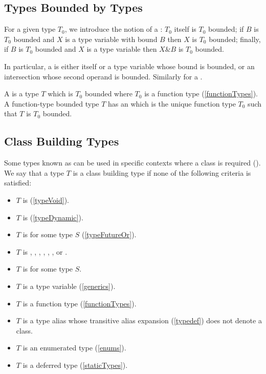 \documentclass[makeidx]{article}
\begin{document}
{\subsection{Types Bounded by Types}

\LMHash{}%
For a given type $T_0$, we introduce the notion of a
:
$T_0$ itself is $T_0$ bounded;
if $B$ is $T_0$ bounded and
$X$ is a type variable with bound $B$
then $X$ is $T_0$ bounded;
finally, if $B$ is $T_0$ bounded and
$X$ is a type variable
then $X \& B$ is $T_0$ bounded.

\LMHash{}%
In particular, a
is either \DYNAMIC{} itself
or a type variable whose bound is \DYNAMIC{} bounded,
or an intersection whose second operand is \DYNAMIC{} bounded.
Similarly for a
.

\LMHash{}%
A
is a type $T$ which is $T_0$ bounded where $T_0$ is a function type
(\ref{functionTypes}).
A function-type bounded type $T$ has an
which is the unique function type $T_0$ such that $T$ is $T_0$ bounded.


\subsection{Class Building Types}

\LMHash{}%
Some types known as
can be used in specific contexts where a class is required
().
We say that a type $T$ is a class building type
if none of the following criteria is satisfied:

\begin{itemize}
\item $T$ is \VOID{} (\ref{typeVoid}).
\item $T$ is \DYNAMIC{} (\ref{typeDynamic}).
\item $T$ is  for some type $S$ (\ref{typeFutureOr}).
\item
  $T$ is , , , , ,
  , or .
\item $T$ is  for some type $S$.
\item $T$ is a type variable (\ref{generics}).
\item $T$ is a function type (\ref{functionTypes}).
\item $T$ is a type alias whose transitive alias expansion
  (\ref{typedef}) does not denote a class.
\item $T$ is an enumerated type (\ref{enums}).
\item $T$ is a deferred type (\ref{staticTypes}).
\end{itemize}


}
\end{document}
